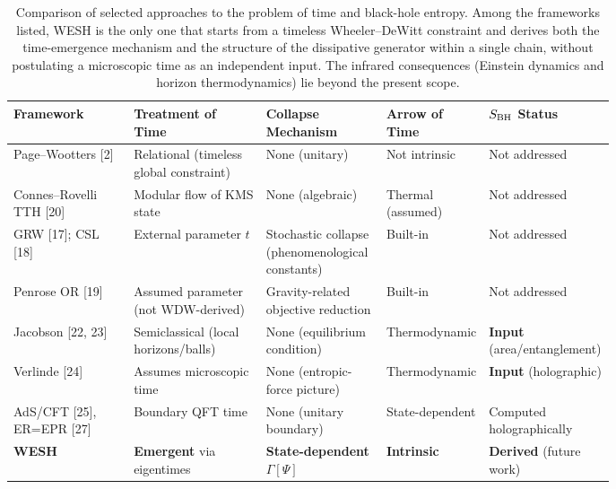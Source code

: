\documentclass[12pt,a4paper]{article}
\newcommand{\Gtime}{\Gamma[\Psi]}
\numberwithin{equation}{section}
\begin{document}
\begin{table}[H]
\centering
\small
\setlength{\tabcolsep}{5pt}
\renewcommand{\arraystretch}{1.2}
\begin{tabularx}{\linewidth}{
  >{\raggedright\arraybackslash}p{0.20\linewidth}
  >{\raggedright\arraybackslash}p{0.22\linewidth}
  >{\raggedright\arraybackslash}p{0.20\linewidth}
  >{\raggedright\arraybackslash}p{0.16\linewidth}
  >{\raggedright\arraybackslash}X}
\toprule
\textbf{Framework} & \textbf{Treatment of Time} & \textbf{Collapse Mechanism} & \textbf{Arrow of Time} & \textbf{$S_{\rm BH}$ Status}\\
\midrule
Page--Wootters [2] & Relational (timeless global constraint) & None (unitary) & Not intrinsic & Not addressed \\
Connes--Rovelli TTH [20] & Modular flow of KMS state & None (algebraic) & Thermal (assumed) & Not addressed \\
GRW [17]; CSL [18] & External parameter $t$ & Stochastic collapse (phenomenological constants) & Built-in & Not addressed \\
Penrose OR [19] & Assumed parameter (not WDW-derived) & Gravity-related objective reduction & Built-in & Not addressed \\
Jacobson [22, 23] & Semiclassical (local horizons/balls) & None (equilibrium condition) & Thermodynamic & \textbf{Input} (area/entanglement) \\
Verlinde [24] & Assumes microscopic time & None (entropic-force picture) & Thermodynamic & \textbf{Input} (holographic) \\
AdS/CFT [25], ER=EPR [27] & Boundary QFT time & None (unitary boundary) & State-dependent & Computed holographically \\
\textbf{WESH} & \textbf{Emergent} via eigentimes & \textbf{State-dependent} $\Gtime$ & \textbf{Intrinsic} & \textbf{Derived} (future work)\\
\bottomrule
\end{tabularx}
\caption{Comparison of selected approaches to the problem of time and black-hole entropy. Among the frameworks listed, WESH is the only one that starts from a timeless Wheeler--DeWitt constraint and derives both the time-emergence mechanism and the structure of the dissipative generator within a single chain, without postulating a microscopic time as an independent input. The infrared consequences (Einstein dynamics and horizon thermodynamics) lie beyond the present scope.}
\label{tab:framework-comparison}
\end{table}
\end{document}
